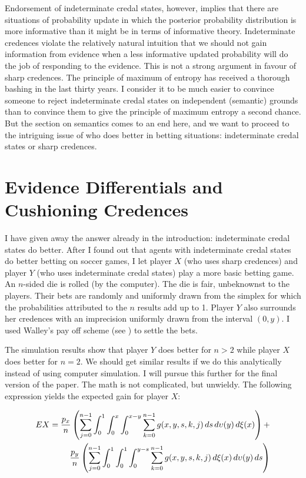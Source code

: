 Endorsement of indeterminate credal states, however,
implies that there are situations of probability update
in which the posterior probability distribution is more
informative than it might be in terms of informative
theory. Indeterminate credences violate the relatively
natural intuition that we should not gain information
from evidence when a less informative updated
probability will do the job of responding to the
evidence. This is not a strong argument in favour of
sharp credences. The principle of maximum of entropy
has received a thorough bashing in the last thirty
years. I consider it to be much easier to convince
someone to reject indeterminate credal states on
independent (semantic) grounds than to convince them to
give the principle of maximum entropy a second chance.
But the section on semantics comes to an end here, and
we want to proceed to the intriguing issue of who does
better in betting situations: indeterminate credal
states or sharp credences.

\section{Evidence Differentials and Cushioning
  Credences}
\label{WalleysWorldCupWoes}

I have given away the answer already in the
introduction: indeterminate credal states do better.
After I found out that agents with indeterminate credal
states do better betting on soccer games, I let player
$X$ (who uses sharp credences) and player $Y$ (who uses
indeterminate credal states) play a more basic betting
game. An $n$-sided die is rolled (by the computer). The
die is fair, unbeknownst to the players. Their bets are
randomly and uniformly drawn from the simplex for which
the probabilities attributed to the $n$ results add up
to 1. Player $Y$ also surrounds her credences with an
imprecision uniformly drawn from the interval $(0,y)$.
I used Walley's pay off scheme (see
) to settle the bets.

The simulation results show that player $Y$ does better
for $n>2$ while player $X$ does better for $n=2$. We
should get similar results if we do this analytically
instead of using computer simulation. I will pursue
this further for the final version of the paper. The
math is not complicated, but unwieldy. The following
expression yields the expected gain for player $X$:

\begin{eqnarray}
  \label{eq:s3}
  EX =
  \frac{p_{x}}{n}\left(\sum_{j=0}^{n-1}\int_{0}^{1}\int_{0}^{x}\int_{0}^{x-y}\sum_{k=0}^{n-1}g(x,y,s,k,j)\,ds\,d\upsilon(y)\,d\xi(x)\right)+
  \notag \\
  \frac{p_{y}}{n}\left(\sum_{j=0}^{n-1}\int_{0}^{1}\int_{0}^{1}\int_{0}^{y-s}\sum_{k=0}^{n-1}g(x,y,s,k,j)\,d\xi(x)\,d\upsilon(y)\,ds\right)
\end{eqnarray}

